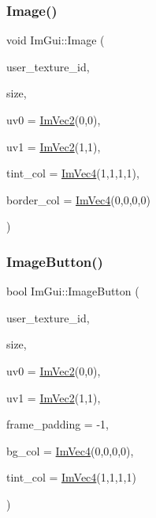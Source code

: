 \mbox{\label{namespace_im_gui_ad8705ac3b718c1b2e84e7b8c34f90249}} 
\subsubsection{\texorpdfstring{Image()}{Image()}}
{\footnotesize\ttfamily void Im\+Gui\+::\+Image (\begin{DoxyParamCaption}\item[{\mbox{\hyperlink{imgui_8h_a364f4447ecbc4ca176145ccff9db6286}{Im\+Texture\+ID}}}]{user\+\_\+texture\+\_\+id,  }\item[{const \mbox{\hyperlink{struct_im_vec2}{Im\+Vec2}} \&}]{size,  }\item[{const \mbox{\hyperlink{struct_im_vec2}{Im\+Vec2}} \&}]{uv0 = {\ttfamily \mbox{\hyperlink{struct_im_vec2}{Im\+Vec2}}(0,0)},  }\item[{const \mbox{\hyperlink{struct_im_vec2}{Im\+Vec2}} \&}]{uv1 = {\ttfamily \mbox{\hyperlink{struct_im_vec2}{Im\+Vec2}}(1,1)},  }\item[{const \mbox{\hyperlink{struct_im_vec4}{Im\+Vec4}} \&}]{tint\+\_\+col = {\ttfamily \mbox{\hyperlink{struct_im_vec4}{Im\+Vec4}}(1,1,1,1)},  }\item[{const \mbox{\hyperlink{struct_im_vec4}{Im\+Vec4}} \&}]{border\+\_\+col = {\ttfamily \mbox{\hyperlink{struct_im_vec4}{Im\+Vec4}}(0,0,0,0)} }\end{DoxyParamCaption})}

\mbox{\label{namespace_im_gui_ac79ef64e8b9e1db73d8237f6a999da14}} 
\subsubsection{\texorpdfstring{Image\+Button()}{ImageButton()}}
{\footnotesize\ttfamily bool Im\+Gui\+::\+Image\+Button (\begin{DoxyParamCaption}\item[{\mbox{\hyperlink{imgui_8h_a364f4447ecbc4ca176145ccff9db6286}{Im\+Texture\+ID}}}]{user\+\_\+texture\+\_\+id,  }\item[{const \mbox{\hyperlink{struct_im_vec2}{Im\+Vec2}} \&}]{size,  }\item[{const \mbox{\hyperlink{struct_im_vec2}{Im\+Vec2}} \&}]{uv0 = {\ttfamily \mbox{\hyperlink{struct_im_vec2}{Im\+Vec2}}(0,0)},  }\item[{const \mbox{\hyperlink{struct_im_vec2}{Im\+Vec2}} \&}]{uv1 = {\ttfamily \mbox{\hyperlink{struct_im_vec2}{Im\+Vec2}}(1,1)},  }\item[{int}]{frame\+\_\+padding = {\ttfamily -\/1},  }\item[{const \mbox{\hyperlink{struct_im_vec4}{Im\+Vec4}} \&}]{bg\+\_\+col = {\ttfamily \mbox{\hyperlink{struct_im_vec4}{Im\+Vec4}}(0,0,0,0)},  }\item[{const \mbox{\hyperlink{struct_im_vec4}{Im\+Vec4}} \&}]{tint\+\_\+col = {\ttfamily \mbox{\hyperlink{struct_im_vec4}{Im\+Vec4}}(1,1,1,1)} }\end{DoxyParamCaption})}

